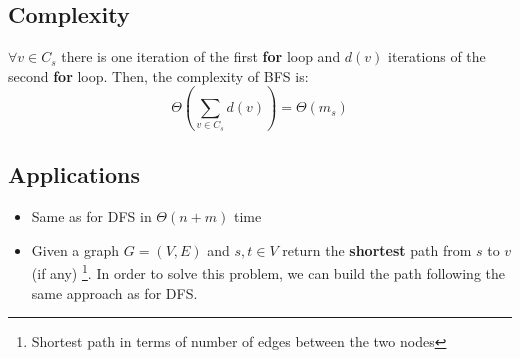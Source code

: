 \subsection{Complexity}
$\forall v \in C_{s}$ there is one iteration of the first \textbf{for} loop and $d(v)$ iterations of the second \textbf{for} loop. Then, the complexity of BFS is:
\[\Theta\left( \sum_{v \in C_{s}} d(v)\right) = \Theta(m_{s})\]

\subsection{Applications}
\begin{itemize}
    \item Same as for DFS in $\Theta(n + m)$ time
    \item Given a graph $G = (V, E)$ and $s,t \in V$ return the \textbf{shortest} path from $s$ to $v$ (if any) \footnote{Shortest path in terms of number of edges between the two nodes}. In order to solve this problem, we can build the path following the same approach as for DFS.
\end{itemize}


